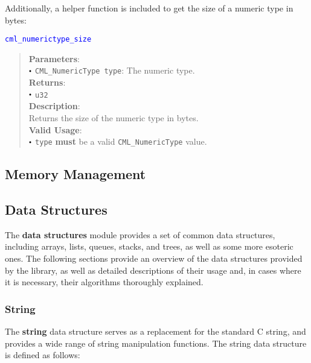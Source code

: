 \documentclass[a4paper,oneside,8pt]{extarticle}
\newcommand{\function}[1]{
  \noindent\textcolor{blue}{\texttt{#1}}
  \vspace{-0.3em}
}
\renewcommand{\dot}{\raisebox{0.3ex}{\scalebox{0.6}{$\bullet$}}}
\theoremstyle{definition}
\begin{document}
Additionally, a helper function is included to get the size of a numeric type in bytes: \newline

\function{cml\_numerictype\_size}
\begin{quote}
  \textbf{Parameters}: \\
  $\dot$ \texttt{CML\_NumericType type}: The numeric type. \\
  \textbf{Returns}: \\
  $\dot$ \texttt{u32} \\
  
  \vspace{-0.75em}
  \textbf{Description}: \\
  Returns the size of the numeric type in bytes. \\

  \vspace{-0.75em}
  \textbf{Valid Usage}: \\
  $\dot$ \texttt{type} \textbf{must} be a valid \texttt{CML\_NumericType} value. \\
\end{quote}

\subsection{Memory Management}

\subsection{Data Structures}

The \textbf{data structures} module provides a set of common data structures, including arrays, lists, queues, stacks, and trees, as well as some more esoteric ones. The following sections provide an overview of the data structures provided by the library, as well as detailed descriptions of their usage and, in cases where it is necessary, their algorithms thoroughly explained.

\subsubsection{String}

The \textbf{string} data structure serves as a replacement for the standard C string, and provides a wide range of string manipulation functions. The string data structure is defined as follows: \newline
\end{document}
